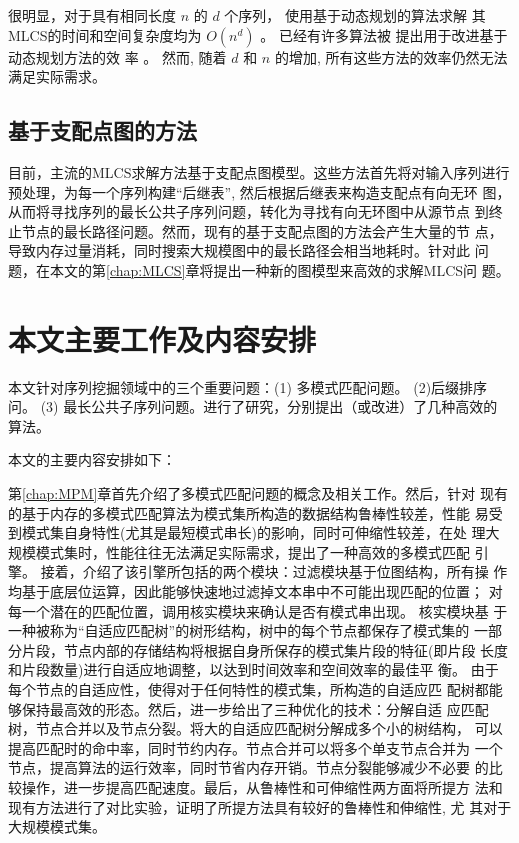 很明显，对于具有相同长度 $n$ 的 $d$ 个序列， 使用基于动态规划的算法求解
其MLCS的时间和空间复杂度均为 $O(n^d)$ \cite{Hsu1984}。 已经有许多算法被
提出用于改进基于动态规划方法的效
率 \cite{Hirschberg1977,Apostolico1992,Masek1980,Rick1994}。 然而, 随着
$d$ 和 $n$ 的增加, 所有这些方法的效率仍然无法满足实际需求。

\subsection{基于支配点图的方法}
\label{sec:DP}

目前，主流的MLCS求解方法基于支配点图模型。这些方法首先将对输入序列进行
预处理，为每一个序列构建“后继表”, 然后根据后继表来构造支配点有向无环
图，从而将寻找序列的最长公共子序列问题，转化为寻找有向无环图中从源节点
到终止节点的最长路径问题。然而，现有的基于支配点图的方法会产生大量的节
点，导致内存过量消耗，同时搜索大规模图中的最长路径会相当地耗时。针对此
问题，在本文的第\ref{chap:MLCS}章将提出一种新的图模型来高效的求解MLCS问
题。


\section{本文主要工作及内容安排}
\label{sec:org}

本文针对序列挖掘领域中的三个重要问题：(1) 多模式匹配问题。 (2)后缀排序
问。 (3) 最长公共子序列问题。进行了研究，分别提出（或改进）了几种高效的
算法。

本文的主要内容安排如下：

第\ref{chap:MPM}章首先介绍了多模式匹配问题的概念及相关工作。然后，针对
现有的基于内存的多模式匹配算法为模式集所构造的数据结构鲁棒性较差，性能
易受到模式集自身特性(尤其是最短模式串长)的影响，同时可伸缩性较差，在处
理大规模模式集时，性能往往无法满足实际需求，提出了一种高效的多模式匹配
引擎。 接着，介绍了该引擎所包括的两个模块：过滤模块基于位图结构，所有操
作均基于底层位运算，因此能够快速地过滤掉文本串中不可能出现匹配的位置；
对每一个潜在的匹配位置，调用核实模块来确认是否有模式串出现。 核实模块基
于一种被称为“自适应匹配树”的树形结构，树中的每个节点都保存了模式集的
一部分片段，节点内部的存储结构将根据自身所保存的模式集片段的特征(即片段
长度和片段数量)进行自适应地调整，以达到时间效率和空间效率的最佳平
衡。 由于每个节点的自适应性，使得对于任何特性的模式集，所构造的自适应匹
配树都能够保持最高效的形态。然后，进一步给出了三种优化的技术：分解自适
应匹配树，节点合并以及节点分裂。将大的自适应匹配树分解成多个小的树结构，
可以提高匹配时的命中率，同时节约内存。节点合并可以将多个单支节点合并为
一个节点，提高算法的运行效率，同时节省内存开销。节点分裂能够减少不必要
的比较操作，进一步提高匹配速度。最后，从鲁棒性和可伸缩性两方面将所提方
法和现有方法进行了对比实验，证明了所提方法具有较好的鲁棒性和伸缩性, 尤
其对于大规模模式集。

